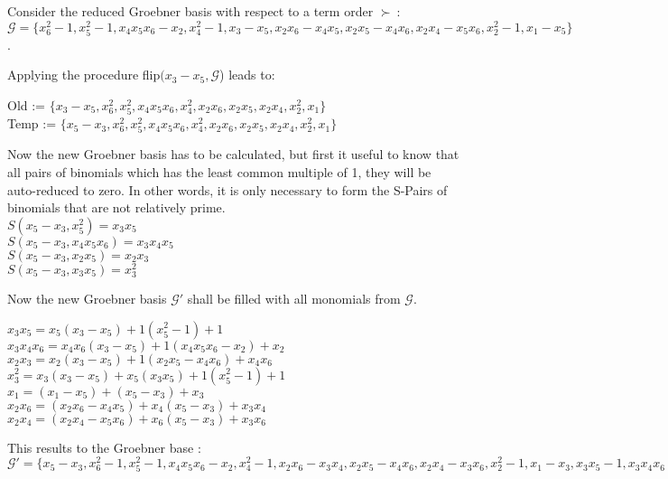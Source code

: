 \begin{env_example}\normalfont
Consider the reduced Groebner basis with respect to a term order $\succ~$: $\mathcal{G}= \{x_{6}^{2}-1,x_{5}^{2}-1, x_{4}x_{5}x_{6} -x_{2},x_{4}^{2}-1,x_{3}-x_{5},x_{2}x_{6}-x_{4}x_{5},x_{2}x_{5}-x_{4}x_{6},x_{2}x_{4}-x_{5}x_{6},x_{2}^{2}-1,x_{1}-x_{5}  \} $.

Applying the procedure flip$(x_{3}-x_{5}, \mathcal{G}$) leads to:

Old := $\{x_{3}-x_{5},x_{6}^{2},x_{5}^{2}, x_{4}x_{5}x_{6} ,x_{4}^{2},x_{2}x_{6},x_{2}x_{5},x_{2}x_{4},x_{2}^{2},x_{1} \} $ \\
Temp := $\{x_{5}-x_{3},x_{6}^{2},x_{5}^{2}, x_{4}x_{5}x_{6} ,x_{4}^{2},x_{2}x_{6},x_{2}x_{5},x_{2}x_{4},x_{2}^{2},x_{1} \} $

Now the new Groebner basis has to be calculated, but first it useful to know that all pairs of binomials which has the least common multiple of 1, they will be auto-reduced to zero. In other words, it is only necessary to form the S-Pairs of binomials that are not relatively prime.\\
$S(x_{5}-x_{3},x_{5}^{2}) = x_{3}x_{5}$ \\
$S(x_{5}-x_{3},x_{4}x_{5}x_{6}) = x_{3}x_{4}x_{5}$ \\
$S(x_{5}-x_{3},x_{2}x_{5}) = x_{2}x_{3}$\\
$S(x_{5}-x_{3},x_{3}x_{5}) = x_{3}^{2}$

Now the new Groebner basis $\mathcal{G}'$ shall be filled with all monomials from $\mathcal{G}$.

$x_{3}x_{5} = x_{5}(x_{3}-x_{5}) + 1(x_{5}^{2}-1) + 1$\\
$x_{3}x_{4}x_{6} = x_{4}x_{6}(x_{3}-x_{5}) + 1(x_{4}x_{5}x_{6}-x_{2}) + x_{2}$\\
$x_{2}x_{3} = x_{2}(x_{3}-x_{5}) + 1(x_{2}x_{5}- x_{4}x_{6}) + x_{4}x_{6}$\\
$x_{3}^{2} = x_{3}(x_{3}-x_{5}) + x_{5}(x_{3}x_{5}) + 1(x_{5}^{2}-1)+1$\\

$x_{1} = (x_{1}-x_{5}) + (x_{5}-x_{3}) + x_{3} $ \\
$x_{2}x_{6} = (x_{2}x_{6}-x_{4}x_{5}) + x_{4}(x_{5}-x_{3}) + x_{3}x_{4} $\\
$x_{2}x_{4} = (x_{2}x_{4}-x_{5}x_{6})+ x_{6}(x_{5}-x_{3}) +x_{3}x_{6} $



This results to the Groebner base : \\
$\mathcal{G}' = \{x_{5}-x_{3}, x_{6}^{2}-1, x_{5}^{2}-1, x_{4}x_{5}x_{6}-x_{2}, x_{4}^{2}-1, x_{2}x_{6}-x_{3}x_{4},
x_{2}x_{5}-x_{4}x_{6}, x_{2}x_{4}-x_{3}x_{6} ,x_{2}^{2}-1,x_{1}-x_{3},x_{3}x_{5}-1,x_{3}x_{4}x_{6}-x_{2},x_{2}x_{3}-x_{4}x_{6},x_{3}^{2}-1   \}$ \\


\end{env_example}
